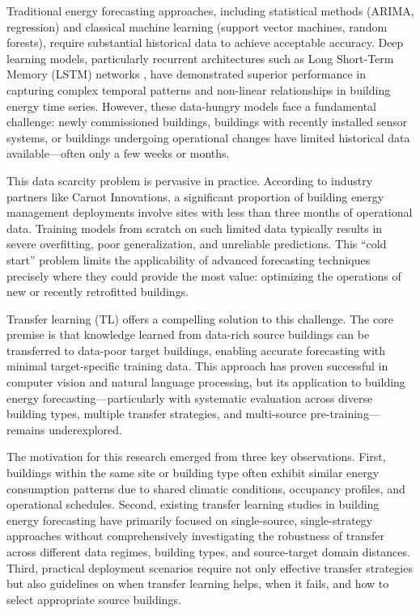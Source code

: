 \documentclass[12pt,a4paper]{report}
\begin{document}
Traditional energy forecasting approaches, including statistical methods (ARIMA, regression) and classical machine learning (support vector machines, random forests), require substantial historical data to achieve acceptable accuracy. Deep learning models, particularly recurrent architectures such as Long Short-Term Memory (LSTM) networks \cite{hochreiter1997long}, have demonstrated superior performance in capturing complex temporal patterns and non-linear relationships in building energy time series. However, these data-hungry models face a fundamental challenge: newly commissioned buildings, buildings with recently installed sensor systems, or buildings undergoing operational changes have limited historical data available—often only a few weeks or months.

This data scarcity problem is pervasive in practice. According to industry partners like Carnot Innovations, a significant proportion of building energy management deployments involve sites with less than three months of operational data. Training models from scratch on such limited data typically results in severe overfitting, poor generalization, and unreliable predictions. This ``cold start'' problem limits the applicability of advanced forecasting techniques precisely where they could provide the most value: optimizing the operations of new or recently retrofitted buildings.

Transfer learning (TL) offers a compelling solution to this challenge. The core premise is that knowledge learned from data-rich source buildings can be transferred to data-poor target buildings, enabling accurate forecasting with minimal target-specific training data. This approach has proven successful in computer vision and natural language processing, but its application to building energy forecasting—particularly with systematic evaluation across diverse building types, multiple transfer strategies, and multi-source pre-training—remains underexplored.

The motivation for this research emerged from three key observations. First, buildings within the same site or building type often exhibit similar energy consumption patterns due to shared climatic conditions, occupancy profiles, and operational schedules. Second, existing transfer learning studies in building energy forecasting have primarily focused on single-source, single-strategy approaches without comprehensively investigating the robustness of transfer across different data regimes, building types, and source-target domain distances. Third, practical deployment scenarios require not only effective transfer strategies but also guidelines on when transfer learning helps, when it fails, and how to select appropriate source buildings.
\end{document}
